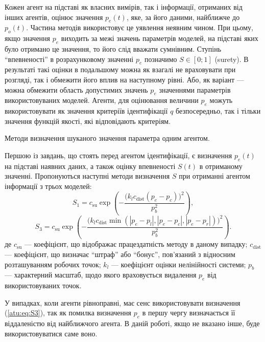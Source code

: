 \documentclass[a4paper,13pt]{atuaref}
\begin{document}
Кожен агент на підставі як власних вимірів, так і інформації, отриманих від
інших агентів, оцінює значення $p_e (t)$, яке, за його даними, найближче до
$p_o (t) $. Частина методів використовує це уявлення неявним чином. При цьому,
якщо значення $ p_e $ виходить за межі значень параметрів моделей, на підставі
яких було отримано це значення, то його слід вважати сумнівним.
Ступінь ``впевненості'' в розрахунковому значенні $p_e$ позначимо $ S \in [0; 1] $ (surety).
В результаті такі оцінки в подальшому можна як
взагалі не враховувати при розгляді, так і обмежити його вплив на наступному
рівні. Або, як варіант --- можна обмежити область допустимих значень $ p_e $
значеннями параметрів використовуваних моделей.
Агенти, для оцінювання величини $ p_e $ можуть використовувати як значення
критеріїв ідентифікації $ q $ безпосередньо, так і тільки значення функцій
якості, які відповідають критеріям.

Методи визначення шуканого значення параметра одним агентом.

Першою із завдань, що стоять перед агентом ідентифікації, є визначення $ p_e(t) $
на підставі наявних даних, а також оцінку впевненості $ S(t) $ в
отриманому значенні.
Пропонуються наступні
методи визначення $S$ при отриманні агентом інформації з трьох моделей:
%
\begin{equation}
  S_1 = c_\mathrm{su} \exp \left( - \frac{ \big( k_l c_\mathrm{dist} ( p_e - p_c ) \big)^2 }{p_b^2} \right)
  ,
  \label{atu:eq:S1}
\end{equation}
%
\begin{equation}
  S_3 = c_\mathrm{su} \exp \left( - \frac{ \big( k_l c_\mathrm{dist} \min( |p_e - p_l|,|p_e - p_c|, |p_e - p_r| ) \big)^2 }{p_b^2} \right)
  .
  \label{atu:eq:S3}
\end{equation}
%
де
$c_\mathrm{su}$ ---
коефіцієнт, що відображає працездатність методу в даному випадку;
$c_\mathrm{dist}$ ---
коефіцієнт, що визначає ``штраф'' або ``бонус'', пов'язаний з відносним розташуванням робочих точок;
$k_l$ ---
коефіцієнт оцінки нелінійності системи;
$p_b$
--- характерний масштаб, щодо якого враховується видалення $ p_e $ від використовуваних точок.

У випадках, коли агенти рівноправні, має сенс використовувати визначення
(\ref{atu:eq:S3}), так як помилка визначення $ p_e $ в першу чергу визначається її
віддаленістю від найближчого агента. В даній роботі, якщо не вказано інше, буде
використовуватися саме воно.
\end{document}
